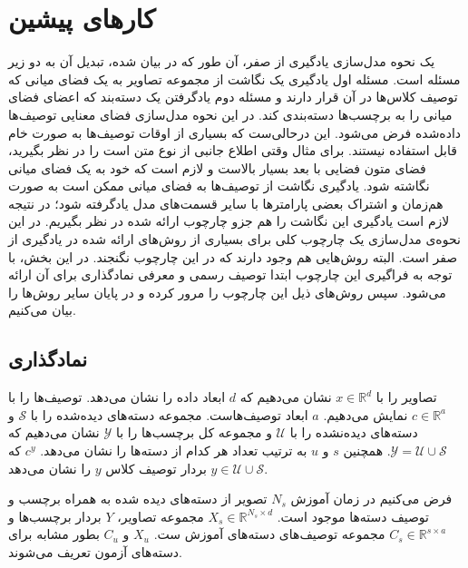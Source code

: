 \section{کارهای پیشین}\label{review}
یک نحوه مدل‌سازی  یادگیری از صفر، آن طور که در \cite{hinton09} بیان شده، تبدیل آن به دو زیر مسئله است. مسئله اول یادگیری یک نگاشت از مجموعه تصاویر به یک فضای میانی که توصیف کلاس‌ها در آن قرار دارند و مسئله دوم یادگرفتن یک دسته‌بند که اعضای فضای میانی را به برچسب‌ها دسته‌بندی کند. در این نحوه مدل‌سازی فضای معنایی توصیف‌ها داده‌شده فرض می‌شود. این درحالی‌ست که بسیاری از اوقات توصیف‌ها به صورت خام قابل استفاده نیستند. برای مثال وقتی اطلاع جانبی از نوع متن است را در نظر بگیرید، فضای متون فضایی با بعد بسیار بالاست و لازم است که خود به یک فضای میانی نگاشته شود. یادگیری نگاشت از توصیف‌ها به فضای میانی ممکن است به صورت هم‌زمان و اشتراک بعضی پارامترها با سایر قسمت‌های مدل یادگرفته شود؛ در نتیجه لازم است یادگیری این نگاشت را هم جزو چارچوب ارائه شده در نظر بگیریم. در این نحوه‌ی مدل‌سازی یک چارچوب کلی برای بسیاری از روش‌های ارائه شده در یادگیری از صفر است. البته روش‌هایی هم وجود دارند که در این چارچوب نگنجند. در این بخش، با توجه به فراگیری این چارچوب ابتدا توصیف رسمی و معرفی نمادگذاری برای آن ارائه می‌شود. سپس روش‌های ذیل این چارچوب را مرور کرده و در پایان سایر روش‌ها را بیان می‌کنیم. 
 
 
 \subsection{نماد‌گذاری} \label{notaion}
 تصاویر را با 
 $x \in \mathbb{R}^d$
 نشان می‌دهیم که $d$ ابعاد داده را نشان می‌دهد. توصیف‌ها را با 
 $ c \in \mathbb{R}^a$
 نمایش می‌دهیم. $a$ ابعاد توصیف‌هاست. مجموعه دسته‌های دیده‌شده را با  $ \mathcal{S}$ و دسته‌های دیده‌نشده را با $ \mathcal{U}$ و مجموعه کل برچسب‌ها را با $ \mathcal{Y}$ 
 نشان می‌دهیم که
 $ \mathcal{Y} =  \mathcal{U} \cup \mathcal{S} $.
 همچنین   $s$ و $u$ به ترتیب تعداد هر کدام از دسته‌ها را نشان می‌دهد. $c^y$ که    $ y \in \mathcal{U} \cup \mathcal{S} $ بردار توصیف کلاس $y$ را نشان می‌دهد.
   
    فرض می‌کنیم در زمان آموزش $N_s$ تصویر از دسته‌های دیده شده به همراه برچسب و  توصیف دسته‌ها موجود است. 
 $X_s \in \mathbb{R}^{N_s \times d}$
  مجموعه تصاویر، $Y$ بردار برچسب‌ها و 
  $C_s \in \mathbb{R}^{s \times a}$
 مجموعه توصیف‌های دسته‌های آموزش ست. $X_u$ و $C_u$ بطور مشابه برای دسته‌های آزمون تعریف می‌شوند. 
 

